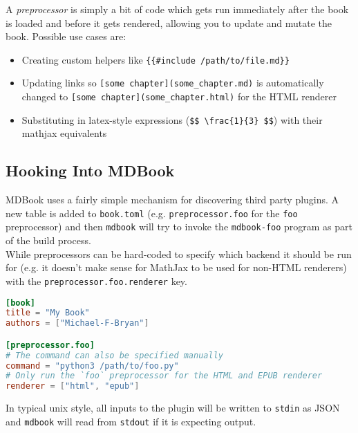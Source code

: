 \documentclass{article}
\begin{document}
A \emph{preprocessor} is simply a bit of code which gets run immediately after the
book is loaded and before it gets rendered, allowing you to update and mutate
the book. Possible use cases are:\\
\begin{itemize}
\item Creating custom helpers like \lstinline|{{#include /path/to/file.md}}|
\item Updating links so \lstinline|[some chapter](some_chapter.md)| is automatically changed
to \lstinline|[some chapter](some_chapter.html)| for the HTML renderer
\item Substituting in latex-style expressions (\lstinline|$$ \frac{1}{3} $$|) with their
mathjax equivalents
\end{itemize}

\subsection{Hooking Into MDBook}
\label{Hooking Into MDBook}
\label{hooking-into-md-book}

MDBook uses a fairly simple mechanism for discovering third party plugins.
A new table is added to \lstinline|book.toml| (e.g. \lstinline|preprocessor.foo| for the \lstinline|foo|
preprocessor) and then \lstinline|mdbook| will try to invoke the \lstinline|mdbook-foo| program as
part of the build process.\\

While preprocessors can be hard-coded to specify which backend it should be run
for (e.g. it doesn't make sense for MathJax to be used for non-HTML renderers)
with the \lstinline|preprocessor.foo.renderer| key.\\
\begin{lstlisting}[language=toml]
[book]
title = "My Book"
authors = ["Michael-F-Bryan"]

[preprocessor.foo]
# The command can also be specified manually
command = "python3 /path/to/foo.py"
# Only run the `foo` preprocessor for the HTML and EPUB renderer
renderer = ["html", "epub"]

\end{lstlisting}

In typical unix style, all inputs to the plugin will be written to \lstinline|stdin| as
JSON and \lstinline|mdbook| will read from \lstinline|stdout| if it is expecting output.\\
\end{document}
